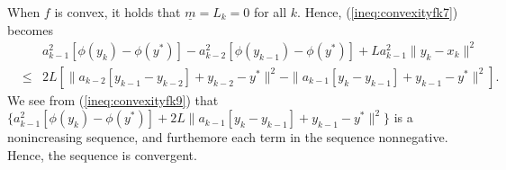 \documentclass[11pt]{article}
\begin{document}
\vspace{10pt}

\noindent When $f$ is convex, it holds that $\underline{m} = L_k = 0$ for all $k$. Hence, (\ref{ineq:convexityfk7}) becomes
\begin{eqnarray}
& & a_{k-1}^2[\phi(y_{k}) - \phi(y^\ast)] - a_{k-2}^2 [\phi(y_{k-1}) - \phi(y^\ast)] + L a_{k-1}^2 \| y_{k} - {x}_{k} \|^2  \nonumber \\
& \leq &   2 L [\|a_{k-2}[ y_{k-1} - y_{k-2}]  + y_{k-2} - y^\ast \|^2 - \| a_{k-1}[ y_{k} - y_{k-1}]  + y_{k-1} - y^\ast \|^2].  \label{ineq:convexityfk9}
\end{eqnarray}
We see from (\ref{ineq:convexityfk9}) that $\{a_{k-1}^2[\phi(y_k) - \phi(y^\ast)] + 2L \|a_{k-1}[y_k - y_{k-1}] + y_{k-1} - y^\ast \|^2 \}$ is a nonincreasing sequence, and furthemore each term in the sequence nonnegative.  Hence, the sequence is convergent.   

\vspace{10pt}
\end{document}
